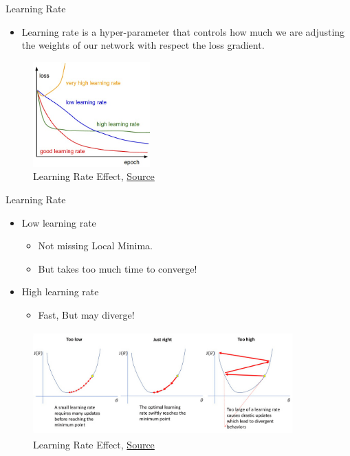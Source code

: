 \documentclass[compress,oilve,t]{beamer}
\begin{document}
\begin{frame}{Learning Rate}
	\begin{itemize}
		\item Learning rate is a hyper-parameter that controls how much we are adjusting the weights of our network with respect the loss gradient. 
	\end{itemize}    
	\begin{figure}[H]
		\centering
		\includegraphics[width=0.4\textwidth]{Figs/lr.png}
		\caption{Learning Rate Effect, \href{https://medium.com/iitg-ai/into-the-depths-of-gradient-descent-52cf9ee92d36}{Source}}
	\end{figure}
\end{frame}

\begin{frame}{Learning Rate}
	\begin{itemize}
		\item Low learning rate 
		\begin{itemize}
			\item Not missing Local Minima.
			\item But takes too much time to converge!
		\end{itemize}
		\item High learning rate 
		\begin{itemize}
			\item Fast, But may diverge!
		\end{itemize}
	\end{itemize}  
	\begin{figure}
		\centering
		\includegraphics[width=10cm, height=4cm]{Figs/lr_high_res.jpg}
		\caption{Learning Rate Effect, \href{https://www.jeremyjordan.me/nn-learning-rate/}{Source}}
	\end{figure}
\end{frame}
\end{document}
